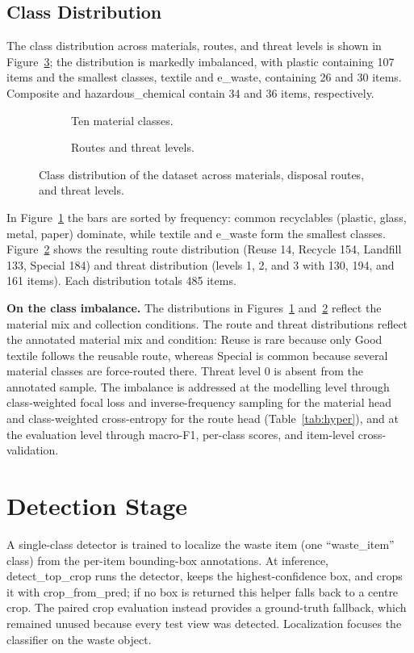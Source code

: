 \subsection{Class Distribution}
The class distribution across materials, routes, and threat levels is shown in Figure~\ref{fig:dist}; the distribution is markedly imbalanced, with plastic containing 107 items and the smallest classes, textile and e\_waste, containing 26 and 30 items. Composite and hazardous\_chemical contain 34 and 36 items, respectively.

\begin{figure}[!ht]
    \centering
    \begin{subfigure}{0.49\textwidth}\centering{}\caption{Ten material classes.}\label{fig:matdist}\end{subfigure}\hfill
    \begin{subfigure}{0.49\textwidth}\centering{}\caption{Routes and threat levels.}\label{fig:rtdist}\end{subfigure}
    \caption{Class distribution of the dataset across materials, disposal routes, and threat levels.}
    \label{fig:dist}
\end{figure}

In Figure~\ref{fig:matdist} the bars are sorted by frequency: common recyclables (plastic, glass, metal, paper) dominate, while textile and e\_waste form the smallest classes. Figure~\ref{fig:rtdist} shows the resulting route distribution (Reuse 14, Recycle 154, Landfill 133, Special 184) and threat distribution (levels 1, 2, and 3 with 130, 194, and 161 items). Each distribution totals 485 items.

\textbf{On the class imbalance.} The distributions in Figures~\ref{fig:matdist} and~\ref{fig:rtdist} reflect the material mix and collection conditions. The route and threat distributions reflect the annotated material mix and condition: Reuse is rare because only Good textile follows the reusable route, whereas Special is common because several material classes are force-routed there. Threat level 0 is absent from the annotated sample. The imbalance is addressed at the modelling level through class-weighted focal loss and inverse-frequency sampling for the material head and class-weighted cross-entropy for the route head (Table~\ref{tab:hyper}), and at the evaluation level through macro-F1, per-class scores, and item-level cross-validation.

\section{Detection Stage}
\label{sec:detection}
A single-class detector is trained to localize the waste item (one ``waste\_item'' class) from the per-item bounding-box annotations. At inference, detect\_\allowbreak top\_\allowbreak crop runs the detector, keeps the highest-confidence box, and crops it with crop\_from\_pred; if no box is returned this helper falls back to a centre crop. The paired crop evaluation instead provides a ground-truth fallback, which remained unused because every test view was detected. Localization focuses the classifier on the waste object.

